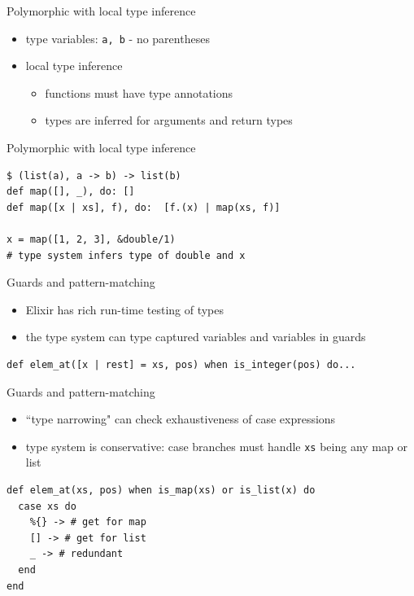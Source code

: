 \documentclass[
  ignorenonframetext,
  aspectratio=169]{beamer}
\newcommand{\passthrough}[1]{#1}
\providecommand{\tightlist}{%
  \setlength{\itemsep}{0pt}\setlength{\parskip}{0pt}}
\begin{document}
\begin{frame}[fragile]{Polymorphic with local type inference}
\label{polymorphic-with-local-type-inference}
\begin{itemize}
\tightlist
\item
  type variables: \passthrough{\lstinline!a, b!} - no parentheses
\item
  local type inference

  \begin{itemize}
  \tightlist
  \item
    functions must have type annotations
  \item
    types are inferred for arguments and return types
  \end{itemize}
\end{itemize}
\end{frame}

\begin{frame}[fragile]{Polymorphic with local type inference}
\label{polymorphic-with-local-type-inference-1}
\begin{lstlisting}
$ (list(a), a -> b) -> list(b)
def map([], _), do: []
def map([x | xs], f), do:  [f.(x) | map(xs, f)]

x = map([1, 2, 3], &double/1)
# type system infers type of double and x
\end{lstlisting}
\end{frame}

\begin{frame}[fragile]{Guards and pattern-matching}
\label{guards-and-pattern-matching}
\begin{itemize}
\tightlist
\item
  Elixir has rich run-time testing of types
\item
  the type system can type captured variables and variables in guards
\end{itemize}

\begin{lstlisting}
def elem_at([x | rest] = xs, pos) when is_integer(pos) do...
\end{lstlisting}
\end{frame}

\begin{frame}[fragile]{Guards and pattern-matching}
\label{guards-and-pattern-matching-1}
\begin{itemize}
\tightlist
\item
  ``type narrowing" can check exhaustiveness of case expressions
\item
  type system is conservative: case branches must handle
  \passthrough{\lstinline!xs!} being any map or list
\end{itemize}

\begin{lstlisting}
def elem_at(xs, pos) when is_map(xs) or is_list(x) do
  case xs do
    %{} -> # get for map
    [] -> # get for list
    _ -> # redundant
  end
end
\end{lstlisting}
\end{frame}
\end{document}
